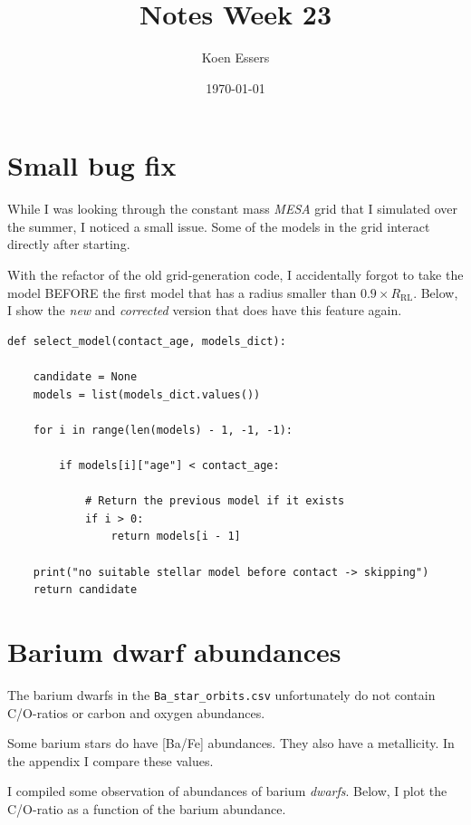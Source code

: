 \documentclass[a4paper,10pt]{article}
\title{Notes Week 23}
\author{Koen Essers}
\date{\today}
\begin{document}
\setuplayout


\section{Small bug fix}

While I was looking through the constant mass \emph{MESA} grid that I simulated over the summer, I noticed a small issue. 
Some of the models in the grid interact directly after starting.
\begin{figure}[ht]
    \centering
\end{figure}

With the refactor of the old grid-generation code, I accidentally forgot to take the model BEFORE the first model that has a radius smaller than \(0.9\times R_\text{RL}\). Below, I show the \emph{new} and \emph{corrected} version that does have this feature again.
\begin{verbatim}
def select_model(contact_age, models_dict):

    candidate = None
    models = list(models_dict.values())

    for i in range(len(models) - 1, -1, -1):

        if models[i]["age"] < contact_age:

            # Return the previous model if it exists
            if i > 0:
                return models[i - 1]

    print("no suitable stellar model before contact -> skipping")
    return candidate
\end{verbatim}

\section{Barium dwarf abundances}
The barium dwarfs in the \lstinline[style=output, breaklines=true]|Ba_star_orbits.csv| unfortunately do not contain C/O-ratios or carbon and oxygen abundances.

Some barium stars do have [Ba/Fe] abundances. They also have a metallicity. In the appendix I compare these values.

I compiled some observation of abundances of barium \emph{dwarfs}. Below, I plot the C/O-ratio as a function of the barium abundance.
\begin{figure}[ht]
    \centering
\end{figure}
\end{document}
